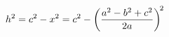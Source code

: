 \documentclass[preview]{standalone}
\begin{document}
\begin{align*}
\special{dvisvgm:raw <g id='unique000'>}h^2 = c^2 - x^2 = c^2 - \left(\frac{a^2-b^2+c^2}{2a}\right)^{\!2}\special{dvisvgm:raw </g>}
\end{align*}
\end{document}
